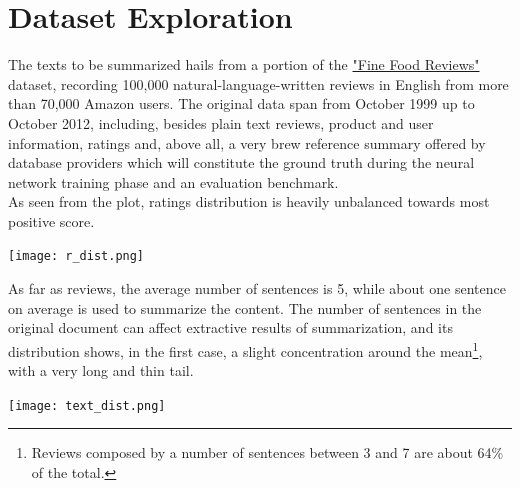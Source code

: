 \documentclass[fleqn,10pt]{SelfArx} %
\affiliation{\textsuperscript{*}\textit{Universita` degli Studi di Milano Bicocca, CdLM in Data Science}}
\begin{document}
\flushbottom %

\maketitle %

\tableofcontents %

\thispagestyle{empty} %

\newpage
\section{Dataset Exploration} 
The texts to be summarized hails from a portion of the \href{https://www.kaggle.com/snap/amazon-fine-food-reviews}{"Fine Food Reviews"} dataset, recording 100,000 natural-language-written reviews in English from more than 70,000 Amazon users. The original data span from October 1999 up to October 2012, including, besides plain text reviews, product and user information, ratings and, above all, a very brew reference summary offered by database providers which will constitute the ground truth during the neural network training phase and an evaluation benchmark.\\
As seen from the plot, ratings distribution is heavily unbalanced towards most positive score.
\par
{\centering\vspace{10pt}
\texttt{[image: r\_dist.png]}
\vspace{10pt}
\par}
As far as reviews, the average number of sentences is 5, while about one sentence on average is used to summarize the content. The number of sentences in the original document can affect extractive results of summarization, and its distribution shows, in the first case, a slight concentration around the mean\footnote{Reviews composed by a number of sentences between 3 and 7 are about 64\% of the total.}, with a very long and thin tail.\par
{\centering\vspace{10pt}
\texttt{[image: text\_dist.png]}
\vspace{10pt}
\par}
\end{document}
